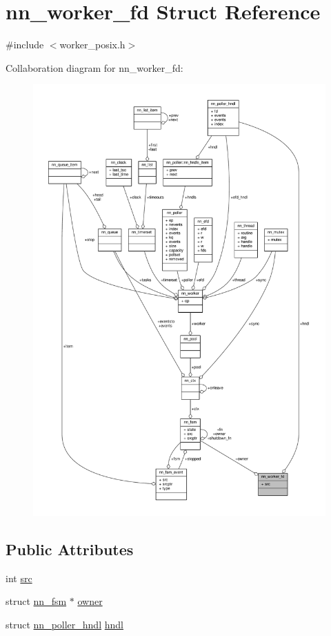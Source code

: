 \hypertarget{structnn__worker__fd}{}\section{nn\+\_\+worker\+\_\+fd Struct Reference}
\label{structnn__worker__fd}


{\ttfamily \#include $<$worker\+\_\+posix.\+h$>$}



Collaboration diagram for nn\+\_\+worker\+\_\+fd\+:\nopagebreak
\begin{figure}[H]
\begin{center}
\leavevmode
\includegraphics[width=350pt]{structnn__worker__fd__coll__graph}
\end{center}
\end{figure}
\subsection*{Public Attributes}
\begin{DoxyCompactItemize}
\item 
int \hyperlink{structnn__worker__fd_ace0f996d09af6bcb852a389fb54c3f8a}{src}
\item 
struct \hyperlink{structnn__fsm}{nn\+\_\+fsm} $\ast$ \hyperlink{structnn__worker__fd_a4f42f80710f93cfc09af3f9845400b06}{owner}
\item 
struct \hyperlink{structnn__poller__hndl}{nn\+\_\+poller\+\_\+hndl} \hyperlink{structnn__worker__fd_a0d0b132d958abe4c94ebbaaf74253cc0}{hndl}
\end{DoxyCompactItemize}


